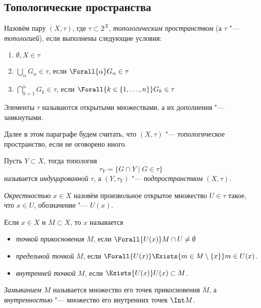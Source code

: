 \documentclass[main]{subfiles}
\begin{document}
\subsection{Топологические пространства}

\begin{definition}
  Назовём пару \( (X, \tau) \), где \( \tau \subset 2^X \),
  \emph{топологическим пространством}
  (а \( \tau \) "--- \emph{топологией}),
  если выполнены следующие условия:
  \begin{enumerate}
    \item \( \emptyset, X \in \tau \)
    \item \( \bigcup_\alpha G_\alpha \in \tau \), если
      \( \Forall{\alpha} G_\alpha \in \tau \)
    \item \( \bigcap_{k = 1}^n G_k \in \tau \), если
      \( \Forall{k \in \{ 1, \dots, n \}} G_k \in \tau \)
  \end{enumerate}
  Элементы \( \tau \) называются открытыми множествами,
  а их дополнения "--- замкнутыми.
\end{definition}

Далее в этом параграфе будем считать,
что \( (X, \tau) \) "--- топологическое пространство,
если не оговорено иного.

\begin{definition}
  Пусть \( Y \subset X \), тогда топология
  \[
    \tau_Y = \{ G \cap Y \mid G \in \tau \}
  \]
  называется \emph{индуцированной} \( \tau \),
  а \( (Y, \tau_Y) \) "--- \emph{подпространством} \( (X, \tau) \).
\end{definition}

\begin{definition}
  \emph{Окрестностью} \( x \in X \) назовём произвольное
  открытое множество \( U \in \tau \) такое,
  что \( x \in U \), обозначение "--- \( U(x) \).
\end{definition}

\begin{definition}
  Если \( x \in X \) и \( M \subset X \), то \( x \)
  называется
  \begin{itemize}
    \item \emph{точкой прикосновения} \( M \), если
      \( \Forall{U(x)} M \cap U \ne \emptyset \)
    \item \emph{предельной точкой} \( M \), если
      \( \Forall{U(x)} \Exists{m \in M \setminus \{ x \}} m \in U(x) \).
    \item \emph{внутренней точкой} \( M \), если
      \( \Exists{U(x)} U(x) \subset M \).
  \end{itemize}
  \emph{Замыканием} \( M \) называется множество его точек прикосновения
  \( \overline{M} \), а \emph{внутренностью} "--- множество его внутренних
  точек \( \Int M \).
\end{definition}
\end{document}
